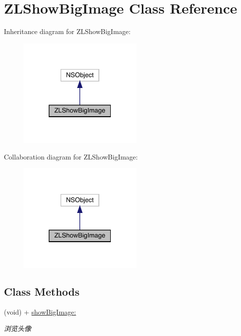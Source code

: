 \hypertarget{interface_z_l_show_big_image}{}\section{Z\+L\+Show\+Big\+Image Class Reference}
\label{interface_z_l_show_big_image}


Inheritance diagram for Z\+L\+Show\+Big\+Image\+:\nopagebreak
\begin{figure}[H]
\begin{center}
\leavevmode
\includegraphics[width=175pt]{interface_z_l_show_big_image__inherit__graph}
\end{center}
\end{figure}


Collaboration diagram for Z\+L\+Show\+Big\+Image\+:\nopagebreak
\begin{figure}[H]
\begin{center}
\leavevmode
\includegraphics[width=175pt]{interface_z_l_show_big_image__coll__graph}
\end{center}
\end{figure}
\subsection*{Class Methods}
\begin{DoxyCompactItemize}
\item 
(void) + \mbox{\hyperlink{interface_z_l_show_big_image_a09ca29c6b7eeece884d5fc773a0c3118}{show\+Big\+Image\+:}}
\begin{DoxyCompactList}\small\item\em 浏览头像 \end{DoxyCompactList}\end{DoxyCompactItemize}


